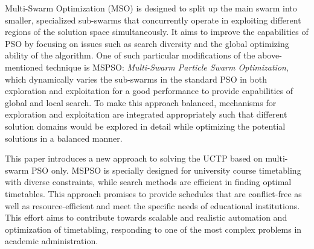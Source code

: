 \documentclass{article}
\begin{document}
Multi-Swarm Optimization (MSO) is designed to split up the main swarm into smaller, specialized sub-swarms that concurrently operate in exploiting different regions of the solution space simultaneously. \cite{Bacanin2022-multiswarm} It aims to improve the capabilities of PSO by focusing on issues such as search diversity and the global optimizing ability of the algorithm. \cite{XIA2018126} One of such particular modifications of the above-mentioned technique is MSPSO: \textit{Multi-Swarm Particle Swarm Optimization}, which dynamically varies the sub-swarms in the standard PSO in both exploration and exploitation for a good performance to provide capabilities of global and local search. \cite{XIA2018126} To make this approach balanced, mechanisms for exploration and exploitation are integrated appropriately such that different solution domains would be explored in detail while optimizing the potential solutions in a balanced manner. \cite{Wang2023-ps} 

This paper introduces a new approach to solving the UCTP based on multi-swarm PSO only. MSPSO is specially designed for university course timetabling with diverse constraints, while search methods are efficient in finding optimal timetables. This approach promises to provide schedules that are conflict-free as well as resource-efficient and meet the specific needs of educational institutions. This effort aims to contribute towards scalable and realistic automation and optimization of timetabling, responding to one of the most complex problems in academic administration.
\end{document}
